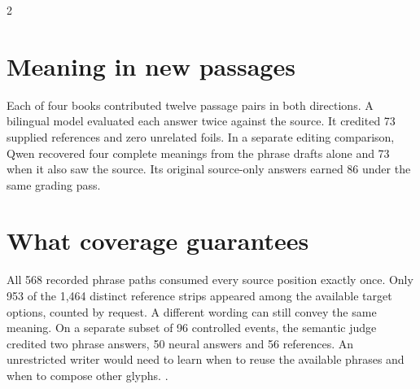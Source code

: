\begin{multicols}{2}
\section*{Meaning in new passages}
Each of four books contributed twelve passage pairs in both directions. A bilingual model evaluated each answer twice against the source. It credited 73 supplied references and zero unrelated foils. In a separate editing comparison, Qwen recovered four complete meanings from the phrase drafts alone and 73 when it also saw the source. Its original source-only answers earned 86 under the same grading pass.
\section*{What coverage guarantees}
All 568 recorded phrase paths consumed every source position exactly once. Only 953 of the 1,464 distinct reference strips appeared among the available target options, counted by request. A different wording can still convey the same meaning. On a separate subset of 96 controlled events, the semantic judge credited two phrase answers, 50 neural answers and 56 references. An unrestricted writer would need to learn when to reuse the available phrases and when to compose other glyphs. .
\end{multicols}
